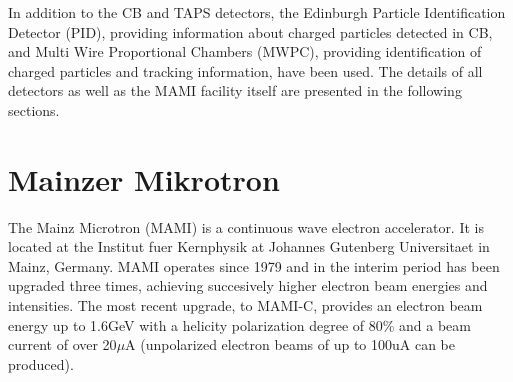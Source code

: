 In addition to the CB and TAPS detectors, the Edinburgh Particle Identification Detector (PID), providing information about charged particles detected in CB, and Multi Wire Proportional Chambers (MWPC), providing identification of charged particles and tracking information, have been used. The details of all detectors as well as the MAMI facility itself are presented in the following sections.

\section{Mainzer Mikrotron}

\indent The Mainz Microtron (MAMI) is a continuous wave electron accelerator. It is located at the Institut fuer Kernphysik at Johannes Gutenberg Universitaet in Mainz, Germany. MAMI operates since 1979 and in the interim period has been upgraded three times, achieving succesively higher electron beam energies and intensities. The most recent upgrade, to MAMI-C, provides an  electron beam energy up to 1.6GeV with a helicity polarization degree of 80\% and a beam current of over 20$\mu$A (unpolarized electron beams of up to 100uA can be produced).

